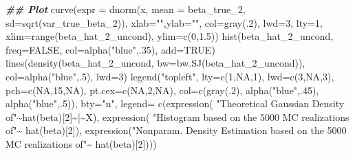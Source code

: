 \documentclass[
  14pt,
]{memoir}
\newenvironment{Shaded}{\begin{snugshade}}{\end{snugshade}}
\newcommand{\AttributeTok}[1]{\textcolor[rgb]{0.77,0.63,0.00}{#1}}
\newcommand{\ConstantTok}[1]{\textcolor[rgb]{0.00,0.00,0.00}{#1}}
\newcommand{\DecValTok}[1]{\textcolor[rgb]{0.00,0.00,0.81}{#1}}
\newcommand{\DocumentationTok}[1]{\textcolor[rgb]{0.56,0.35,0.01}{\textbf{\textit{#1}}}}
\newcommand{\FloatTok}[1]{\textcolor[rgb]{0.00,0.00,0.81}{#1}}
\newcommand{\FunctionTok}[1]{\textcolor[rgb]{0.00,0.00,0.00}{#1}}
\newcommand{\NormalTok}[1]{#1}
\newcommand{\SpecialCharTok}[1]{\textcolor[rgb]{0.00,0.00,0.00}{#1}}
\newcommand{\StringTok}[1]{\textcolor[rgb]{0.31,0.60,0.02}{#1}}
\begin{document}
\begin{Shaded}
\begin{Highlighting}[]
\DocumentationTok{\#\# Plot}
\FunctionTok{curve}\NormalTok{(}\AttributeTok{expr =} \FunctionTok{dnorm}\NormalTok{(x, }\AttributeTok{mean =}\NormalTok{ beta\_true\_2, }
                   \AttributeTok{sd=}\FunctionTok{sqrt}\NormalTok{(var\_true\_beta\_2)), }
      \AttributeTok{xlab=}\StringTok{""}\NormalTok{,}\AttributeTok{ylab=}\StringTok{""}\NormalTok{, }\AttributeTok{col=}\FunctionTok{gray}\NormalTok{(.}\DecValTok{2}\NormalTok{), }\AttributeTok{lwd=}\DecValTok{3}\NormalTok{, }\AttributeTok{lty=}\DecValTok{1}\NormalTok{, }
      \AttributeTok{xlim=}\FunctionTok{range}\NormalTok{(beta\_hat\_2\_uncond), }\AttributeTok{ylim=}\FunctionTok{c}\NormalTok{(}\DecValTok{0}\NormalTok{,}\FloatTok{1.5}\NormalTok{))}
\FunctionTok{hist}\NormalTok{(beta\_hat\_2\_uncond, }\AttributeTok{freq=}\ConstantTok{FALSE}\NormalTok{, }\AttributeTok{col=}\FunctionTok{alpha}\NormalTok{(}\StringTok{"blue"}\NormalTok{,.}\DecValTok{35}\NormalTok{), }\AttributeTok{add=}\ConstantTok{TRUE}\NormalTok{)}
\FunctionTok{lines}\NormalTok{(}\FunctionTok{density}\NormalTok{(beta\_hat\_2\_uncond, }\AttributeTok{bw=}\FunctionTok{bw.SJ}\NormalTok{(beta\_hat\_2\_uncond)), }
      \AttributeTok{col=}\FunctionTok{alpha}\NormalTok{(}\StringTok{"blue"}\NormalTok{,.}\DecValTok{5}\NormalTok{), }\AttributeTok{lwd=}\DecValTok{3}\NormalTok{)}
\FunctionTok{legend}\NormalTok{(}\StringTok{"topleft"}\NormalTok{, }\AttributeTok{lty=}\FunctionTok{c}\NormalTok{(}\DecValTok{1}\NormalTok{,}\ConstantTok{NA}\NormalTok{,}\DecValTok{1}\NormalTok{), }\AttributeTok{lwd=}\FunctionTok{c}\NormalTok{(}\DecValTok{3}\NormalTok{,}\ConstantTok{NA}\NormalTok{,}\DecValTok{3}\NormalTok{), }\AttributeTok{pch=}\FunctionTok{c}\NormalTok{(}\ConstantTok{NA}\NormalTok{,}\DecValTok{15}\NormalTok{,}\ConstantTok{NA}\NormalTok{), }\AttributeTok{pt.cex=}\FunctionTok{c}\NormalTok{(}\ConstantTok{NA}\NormalTok{,}\DecValTok{2}\NormalTok{,}\ConstantTok{NA}\NormalTok{),}
     \AttributeTok{col=}\FunctionTok{c}\NormalTok{(}\FunctionTok{gray}\NormalTok{(.}\DecValTok{2}\NormalTok{), }\FunctionTok{alpha}\NormalTok{(}\StringTok{"blue"}\NormalTok{,.}\DecValTok{45}\NormalTok{), }\FunctionTok{alpha}\NormalTok{(}\StringTok{"blue"}\NormalTok{,.}\DecValTok{5}\NormalTok{)), }\AttributeTok{bty=}\StringTok{"n"}\NormalTok{, }\AttributeTok{legend=} 
\FunctionTok{c}\NormalTok{(}\FunctionTok{expression}\NormalTok{(}
  \StringTok{"Theoretical Gaussian Density of"}\SpecialCharTok{\textasciitilde{}}\FunctionTok{hat}\NormalTok{(beta)[}\DecValTok{2}\NormalTok{]}\SpecialCharTok{\textasciitilde{}}\StringTok{\textquotesingle{}|\textquotesingle{}}\SpecialCharTok{\textasciitilde{}}\NormalTok{X), }
\FunctionTok{expression}\NormalTok{(}
  \StringTok{"Histogram based on the 5000 MC realizations of"}\SpecialCharTok{\textasciitilde{}}
  \FunctionTok{hat}\NormalTok{(beta)[}\DecValTok{2}\NormalTok{]), }
\FunctionTok{expression}\NormalTok{(}\StringTok{"Nonparam. Density Estimation based on the 5000 MC realizations of"}\SpecialCharTok{\textasciitilde{}}
  \FunctionTok{hat}\NormalTok{(beta)[}\DecValTok{2}\NormalTok{])))}
\end{Highlighting}
\end{Shaded}
\end{document}
